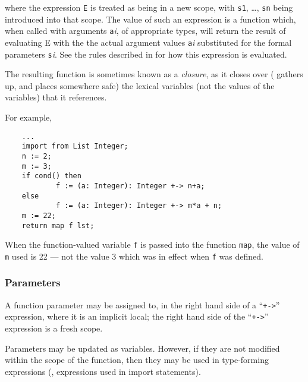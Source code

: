 where the expression {\tt E} is treated as being in a new scope,
with {\tt s1}, \ldots, {\tt sn} being introduced into that scope.
The value of such an expression is a function which, when called with
arguments {\tt a}{\em i}, of appropriate types, will return the result
of evaluating E with the the actual argument values {\tt a}{\em i}
substituted for the formal parameters {\tt s}{\em i}. See the rules
described in  for how this expression is
evaluated.

The resulting function is sometimes known as a {\em closure}, as it
closes over (\ie{} gathers up, and places somewhere safe) the lexical
variables (not the values of the variables) that it references.

For example,

\begin{small}
\begin{verbatim}
    ...
    import from List Integer;
    n := 2;
    m := 3;
    if cond() then
            f := (a: Integer): Integer +-> n+a;
    else
            f := (a: Integer): Integer +-> m*a + n;
    m := 22;
    return map f lst;
\end{verbatim}
\end{small}

When the function-valued variable {\tt f} is passed into the function
{\tt map}, the value of {\tt m} used is 22 --- not the value 3 which was
in effect when {\tt f} was defined.

\subsubsection{Parameters}

A function parameter may be assigned to, in the right hand side of a
``\verb:+->:'' expression, where it is an implicit local; the right hand
side of the ``\verb:+->:'' expression is a fresh scope.

Parameters may be updated as variables. However, if they are not
modified within the scope of the function, then they may be used in
type-forming expressions (\eg{}, expressions used in import statements).


